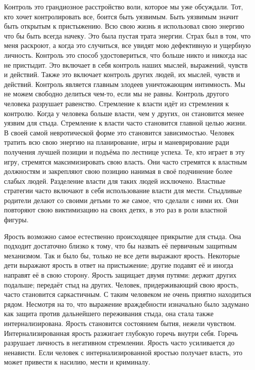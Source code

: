 \documentclass[10pt, fleqn]{article}
\begin{document}
Контроль это грандиозное расстройство воли, которое мы уже обсуждали. Тот, кто хочет контролировать все, боится быть уязвимым. Быть уязвимым значит быть открытым к пристыжению.
Всю свою жизнь я использовал свою энергию что бы быть всегда начеку. Это была пустая трата энергии. Страх был в том, что меня раскроют, а когда это случиться, все увидят мою дефективную и ущербную личность.
Контроль это способ удостовериться, что больше никто и никогда нас не пристыдит. Это включает в себя контроль наших мыслей, выражений, чувств и действий. Также это включает контроль других людей, их мыслей, чувств и действий. Контроль является главным злодеев уничтожающим интимность. Мы не можем свободно делиться чем-то, если мы не равны. Контроль другого человека разрушает равенство.
Стремление к власти идёт из стремления к контролю. Когда у человека больше власти, чем у других, он становится менее уязвим для стыда. Стремление к власти часто становится главной целью жизни. В своей самой невротической форме это становится зависимостью. Человек тратить всю свою энергию на планирование, игры и маневрирование ради получения лучшей позиции и подъёма по лестнице успеха.
Те, кто играет в эту игру, стремятся максимизировать свою власть. Они часто стремятся к властным должностям и закрепляют свою позицию нанимая в своё подчинение более слабых людей. Разделение власти для таких людей исключено.
Властные стратегии часто включают в себя использование власти для мести. Стыдливые родители делают со своими детьми то же самое, что сделали с ними их. Они повторяют свою виктимизацию на своих детях, в это раз в роли властной фигуры.


Ярость возможно самое естественно происходящее прикрытие для стыда. Она подходит достаточно близко к тому, что бы назвать её первичным защитным механизмом. Так и было бы, только не все дети выражают ярость. Некоторые дети выражают ярость в ответ на пристыжение; другие подавят её и иногда направят её в свою сторону.
Ярость защищает двумя путями: держит других подальше; передаёт стыд на других. Человек, придерживающий свою ярость, часто становится саркастичным. С таким человеком не очень приятно находиться рядом.
Несмотря на то, что выражение враждебности изначально было задумано как защита против дальнейшего переживания стыда, она стала также интернализирована. Ярость становится состоянием бытия, нежели чувством.
Интернализированная ярость разжигает глубокую горечь внутри себя. Горечь разрушает личность в негативном стремлении. Ярость часто усиливается до ненависти. Если человек с интернализированной яростью получает власть, это может привести к насилию, мести и криминалу.
\end{document}
